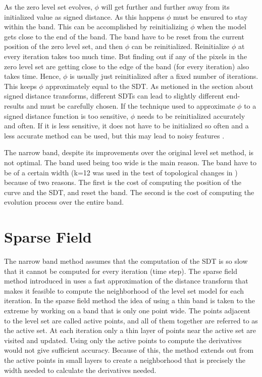 As the zero level set evolves, \(\phi\) will get further and further away from its initialized value as signed distance. As this happens \(\phi\) must be ensured to stay within the band. This can be accomplished by reinitializing \(\phi\) when the model gets close to the end of the band. The band have to be reset from the current position of the zero level set, and then \(\phi\) can be reinitialized. Reinitialize \(\phi\) at every iteration takes too much time. But finding out if any of the pixels in the zero level set are getting close to the edge of the band (for every iteration) also takes time. Hence, \(\phi\) is usually just reinitialized after a fixed number of iterations. This keeps \(\phi\) approximately equal to the SDT. As metioned in the section about signed distance transforms, different SDTs can lead to slightly different end-results and must be carefully chosen. If the technique used to approximate \(\phi\) to a signed distance function is too sensitive, \(\phi\) needs to be reinitialized accurately and often. If it is less sensitive, it does not have to be initialized so often and a less accurate method can be used, but this may lead to noisy features \cite{osher02}.

The narrow band, despite its improvements over the original level set method, is not optimal. The band used being too wide is the main reason. The band have to be of a certain width (k=12 was used in the test of topological changes in \cite{adalsteinsson94}) because of two reasons\cite{whitaker89}. The first is the cost of computing the position of the curve and the SDT, and reset the band. The second is the cost of computing the evolution process over the entire band.

\section{Sparse Field}
The narrow band  method assumes that the computation of the SDT is so slow that it cannot be computed for every iteration (time step). The sparse field method introduced in \cite{whitaker89} uses a fast approximation of the distance transform that makes it feasible to compute the neighborhood of the level set model for each iteration. In the sparse field method the idea of using a thin band is taken to the extreme by working on a band that is only one point wide. The points adjacent to the level set are called active points, and all of them together are referred to as the active set. At each iteration only a thin layer of points near the active set are visited and updated. Using only the active points to compute the derivatives would not give sufficient accuracy. Because of this, the method extends out from the active points in small layers to create a neighborhood that is precisely the width needed to calculate the derivatives needed. 


